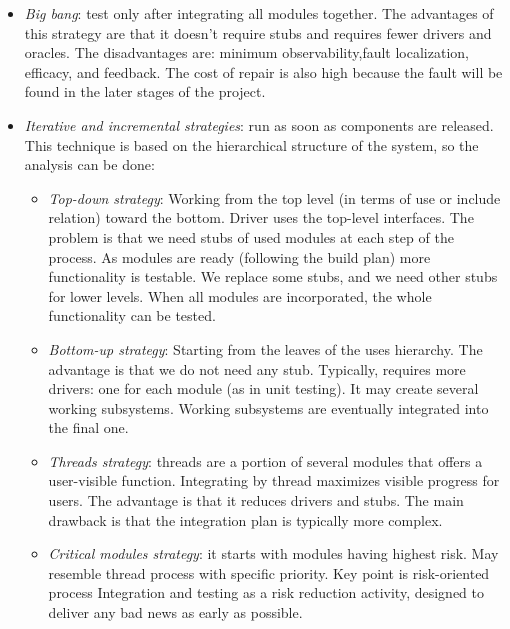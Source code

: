 \begin{itemize}
    \item \textit{Big bang}: test only after integrating all modules together. 
        The advantages of this strategy are that it doesn't require stubs and requires fewer drivers and oracles. 
        The disadvantages are: minimum observability,fault localization, efficacy, and feedback. 
        The cost of repair is also high because the fault will be found in the later stages of the project. 
    \item \textit{Iterative and incremental strategies}: run as soon as components are released.
        This technique is based on the hierarchical structure of the system, so the analysis can be done: 
        \begin{itemize}
            \item \textit{Top-down strategy}: Working from the top level (in terms of use or include relation) toward the bottom. 
                Driver uses the top-level interfaces.
                The problem is that we need stubs of used modules at each step of the process. 
                As modules are ready (following the build plan) more functionality is testable.
                We replace some stubs, and we need other stubs for lower levels.
                When all modules are incorporated, the whole functionality can be tested. 
            \item \textit{Bottom-up strategy}: Starting from the leaves of the uses hierarchy.
                The advantage is that we do not need any stub. 
                Typically, requires more drivers: one for each module (as in unit testing). 
                It may create several working subsystems. 
                Working subsystems are eventually integrated into the final one. 
            \item \textit{Threads strategy}: threads are a portion of several modules that offers a user-visible function. 
                Integrating by thread maximizes visible progress for users. 
                The advantage is that it reduces drivers and stubs. 
                The main drawback is that the integration plan is typically more complex. 
            \item \textit{Critical modules strategy}: it starts with modules having highest risk. 
                May resemble thread process with specific priority. 
                Key point is risk-oriented process
                Integration and testing as a risk reduction activity, designed to deliver any bad news as early as possible.
        \end{itemize}
\end{itemize}

